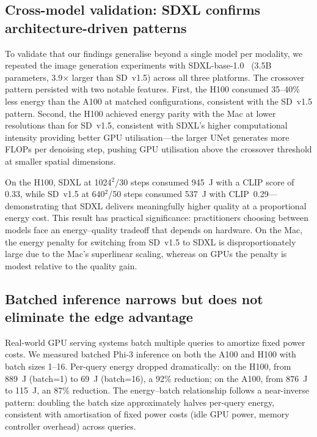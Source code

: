 \documentclass[preprint,12pt]{elsarticle}
\begin{document}
\subsection{Cross-model validation: SDXL confirms architecture-driven patterns}

To validate that our findings generalise beyond a single model per modality, we repeated the image generation experiments with SDXL-base-1.0~\cite{podell2023sdxl} (3.5B parameters, 3.9$\times$ larger than SD~v1.5) across all three platforms. The crossover pattern persisted with two notable features. First, the H100 consumed 35--40\% less energy than the A100 at matched configurations, consistent with the SD~v1.5 pattern. Second, the H100 achieved energy parity with the Mac at lower resolutions than for SD~v1.5, consistent with SDXL's higher computational intensity providing better GPU utilisation---the larger UNet generates more FLOPs per denoising step, pushing GPU utilisation above the crossover threshold at smaller spatial dimensions.

On the H100, SDXL at 1024$^2$/30 steps consumed 945~J with a CLIP score of 0.33, while SD~v1.5 at 640$^2$/50 steps consumed 537~J with CLIP~0.29---demonstrating that SDXL delivers meaningfully higher quality at a proportional energy cost. This result has practical significance: practitioners choosing between models face an energy--quality tradeoff that depends on hardware. On the Mac, the energy penalty for switching from SD~v1.5 to SDXL is disproportionately large due to the Mac's superlinear scaling, whereas on GPUs the penalty is modest relative to the quality gain.

\subsection{Batched inference narrows but does not eliminate the edge advantage}
\label{sec:batched}

Real-world GPU serving systems batch multiple queries to amortize fixed power costs. We measured batched Phi-3 inference on both the A100 and H100 with batch sizes 1--16. Per-query energy dropped dramatically: on the H100, from 889~J (batch=1) to 69~J (batch=16), a 92\% reduction; on the A100, from 876~J to 115~J, an 87\% reduction. The energy--batch relationship follows a near-inverse pattern: doubling the batch size approximately halves per-query energy, consistent with amortisation of fixed power costs (idle GPU power, memory controller overhead) across queries.
\end{document}
